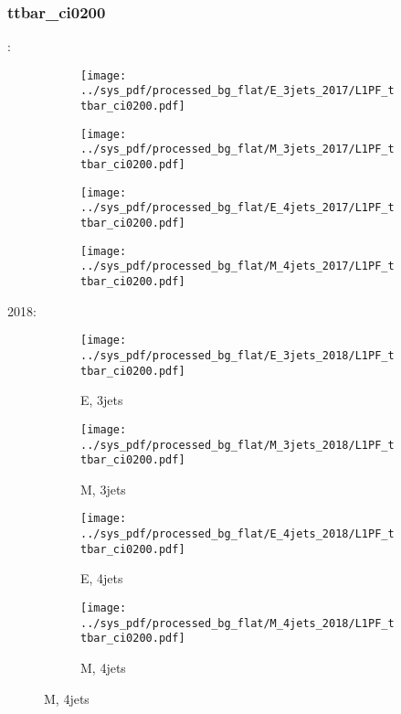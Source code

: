 \documentclass{beamer}
\begin{document}
\begin{frame}
\frametitle{ttbar_ci0200}
\fontsize{5}{1}:
\begin{figure}
\centering
\begin{subfigure}[b]{0.24\textwidth}
\texttt{[image: ../sys\_pdf/processed\_bg\_flat/E\_3jets\_2017/L1PF\_ttbar\_ci0200.pdf]}
\end{subfigure}
\begin{subfigure}[b]{0.24\textwidth}
\texttt{[image: ../sys\_pdf/processed\_bg\_flat/M\_3jets\_2017/L1PF\_ttbar\_ci0200.pdf]}
\end{subfigure}
\begin{subfigure}[b]{0.24\textwidth}
\texttt{[image: ../sys\_pdf/processed\_bg\_flat/E\_4jets\_2017/L1PF\_ttbar\_ci0200.pdf]}
\end{subfigure}
\begin{subfigure}[b]{0.24\textwidth}
\texttt{[image: ../sys\_pdf/processed\_bg\_flat/M\_4jets\_2017/L1PF\_ttbar\_ci0200.pdf]}
\end{subfigure}
\end{figure}
2018:
\begin{figure}
\centering
\begin{subfigure}[b]{0.24\textwidth}
\texttt{[image: ../sys\_pdf/processed\_bg\_flat/E\_3jets\_2018/L1PF\_ttbar\_ci0200.pdf]}
\captionsetup{font=tiny}
\caption{E, 3jets}
\end{subfigure}
\begin{subfigure}[b]{0.24\textwidth}
\texttt{[image: ../sys\_pdf/processed\_bg\_flat/M\_3jets\_2018/L1PF\_ttbar\_ci0200.pdf]}
\captionsetup{font=tiny}
\caption{M, 3jets}
\end{subfigure}
\begin{subfigure}[b]{0.24\textwidth}
\texttt{[image: ../sys\_pdf/processed\_bg\_flat/E\_4jets\_2018/L1PF\_ttbar\_ci0200.pdf]}
\captionsetup{font=tiny}
\caption{E, 4jets}
\end{subfigure}
\begin{subfigure}[b]{0.24\textwidth}
\texttt{[image: ../sys\_pdf/processed\_bg\_flat/M\_4jets\_2018/L1PF\_ttbar\_ci0200.pdf]}
\captionsetup{font=tiny}
\caption{M, 4jets}
\end{subfigure}
\end{figure}
\end{frame}
\end{document}

